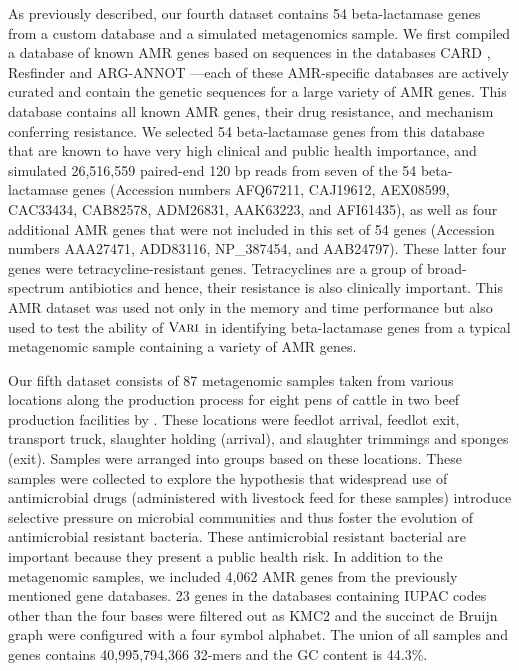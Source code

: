 As previously described, our fourth dataset contains 54 beta-lactamase genes from a custom database and a simulated metagenomics sample.  We first compiled a database of known AMR genes based on sequences in the databases CARD \citep{mcarthur}, Resfinder \citep{zankari} and ARG-ANNOT \citep{gupta}---each of these AMR-specific databases are actively curated and contain the genetic sequences for a large variety of AMR genes.  This database contains all known AMR genes, their drug resistance, and mechanism conferring resistance.  We selected 54 beta-lactamase genes from this database that are known to have very high clinical and public health importance, and simulated 26,516,559 paired-end 120 bp reads from seven of the 54 beta-lactamase genes (Accession numbers AFQ67211, CAJ19612, AEX08599, CAC33434, CAB82578, ADM26831, AAK63223, and AFI61435), as well as four additional AMR genes that were not included in this set of 54 genes (Accession numbers AAA27471, ADD83116, NP\_387454, and AAB24797).  These latter four genes were tetracycline-resistant genes.  Tetracyclines are a group of broad-spectrum antibiotics and hence, their resistance is also clinically important.   This AMR dataset was used not only in the memory and time performance but also used to test the ability of $\mbox{\rm {\sc Vari}}$ in identifying beta-lactamase genes from a typical metagenomic sample containing a variety of AMR genes.  %


Our fifth dataset consists of 87 metagenomic samples taken from various locations along the production process for eight pens of cattle in two beef production facilities by \cite{noyes2016resistome}.  These locations were feedlot arrival, feedlot exit, transport truck, slaughter holding (arrival), and slaughter trimmings and sponges (exit).  Samples were arranged into groups based on these locations. These samples were collected to explore the hypothesis that widespread use of antimicrobial drugs (administered with livestock feed for these samples) introduce selective pressure on microbial communities and thus foster the evolution of antimicrobial resistant bacteria.  These antimicrobial resistant bacterial are important because they present a public health risk.  In addition to the metagenomic samples, we included 4,062 AMR genes from the previously mentioned gene databases.  23 genes in the databases containing IUPAC codes other than the four bases were filtered out as KMC2 and the succinct de Bruijn graph were configured with a four symbol alphabet.  The union of all samples and genes contains 40,995,794,366 32-mers and the GC content is 44.3\%.





